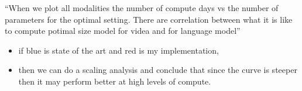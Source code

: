 \documentclass[11pt]{article}
\begin{document}
\begin{minipage}[l]{.5\linewidth}
    \begin{figure}[H]
        \centering
    \end{figure}    
\end{minipage}\hfill
\begin{minipage}[r]{.48\linewidth}
    ``When we plot all modalities the number of compute days vs the number of parameters for the optimal setting. There are correlation between what it is like to compute potimal size model for videa and for language model''
\end{minipage}

\begin{minipage}[l]{.5\linewidth}
    \begin{figure}[H]
        \centering
    \end{figure}    
\end{minipage}\hfill
\begin{minipage}[r]{.48\linewidth}
    \begin{itemize}
        \item if blue is state of the art and red is my implementation,
        \item then we can do a scaling analysis and conclude that since the curve is steeper then it may perform better at high levels of compute. 
    \end{itemize}
\end{minipage}
\end{document}

